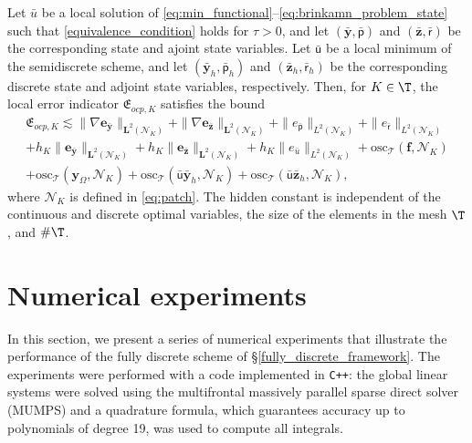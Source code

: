 \documentclass[final]{siamart0216}
\begin{document}
\begin{theorem}\label{eq:efficiency_est_semi}
Let $\bar{u}$ be a local solution of \eqref{eq:min_functional}--\eqref{eq:brinkamn_problem_state} such that \eqref{equivalence_condition} holds for $\tau > 0$, and let $(\bar{\mathbf{y}},\bar{\mathsf{p}})$ and $(\bar{\mathbf{z}},\bar{\mathsf{r}})$ be the corresponding state and ajoint state variables. Let $\bar{\mathsf{u}}$ be a local minimum of the semidiscrete scheme, and let $(\bar{\mathbf{y}}_h,\bar{\mathsf{p}}_h)$ and $(\bar{\mathbf{z}}_h,\bar{\mathsf{r}}_h)$ be the corresponding discrete state and adjoint state variables, respectively. Then, for $K\in\T$, the local error indicator $\mathfrak{E}_{ocp,K}$ satisfies the bound 
\begin{multline}\label{eq:efficiency_estimates_ocp_semi}
\mathfrak{E}_{ocp,K} \lesssim\|\nabla \mathbf{e}_{\bar{\mathbf{y}}} \|_{\mathbf{L}^2(\mathcal{N}_{K})}+\|\nabla \mathbf{e}_{\bar{\mathbf{z}}} \|_{\mathbf{L}^2(\mathcal{N}_{K})}
+
\| e_{\bar{\mathsf{p}}} \|_{L^2(\mathcal{N}_{K})}
+
\| e_{\bar{\mathsf{r}}} \|_{L^2(\mathcal{N}_{K})}
\\
+
h_K \| \mathbf{e}_{\bar{\mathbf{y}}} \|_{\mathbf{L}^2(\mathcal{N}_{K})}
+
h_K\| \mathbf{e}_{\bar{\mathbf{z}}} \|_{\mathbf{L}^2(\mathcal{N}_{K})}
+
h_K \|e_{\bar{u}}\|_{L^2(\mathcal{N}_{K})}
+
\mathrm{osc}_{\mathscr{T}}(\mathbf{f},\mathcal{N}_{K})\\
+
\mathrm{osc}_{\mathscr{T}}(\mathbf{y}_{\Omega},\mathcal{N}_{K})
+
\mathrm{osc}_{\mathscr{T}}(\bar{\mathsf{u}}\bar{\mathbf{y}}_h,\mathcal{N}_{K})
+
\mathrm{osc}_{\mathscr{T}}(\bar{\mathsf{u}}\bar{\mathbf{z}}_h,\mathcal{N}_{K}),
\end{multline}
where $\mathcal{N}_{K}$ is defined in \eqref{eq:patch}. The hidden constant is independent of the continuous and discrete optimal variables, the size of the elements in the mesh $\T$, and $\#\T$.
\end{theorem}


\section{Numerical experiments}
\label{sec:numericalexperiments}

In this section, we present a series of numerical experiments that illustrate the performance of the fully discrete scheme of \S \ref{fully_discrete_framework}. The experiments were performed with a code implemented in \texttt{C++}: the global linear systems were solved using the multifrontal massively parallel sparse direct solver (MUMPS) \cite{MUMPS2} and a quadrature formula, which guarantees accuracy up to polynomials of degree 19, was used to compute all integrals.
\end{document}

